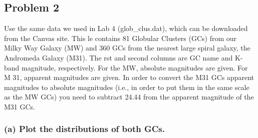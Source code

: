 \documentclass[11pt]{article}
\begin{document}
    \hypertarget{problem-2}{%
\subsection{Problem 2}\label{problem-2}}

    Use the same data we used in Lab 4 (glob\_clus.dat), which can be
downloaded from the Canvas site. This le contains 81 Globular Clusters
(GCs) from our Milky Way Galaxy (MW) and 360 GCs from the nearest large
spiral galaxy, the Andromeda Galaxy (M31). The rst and second columns
are GC name and K-band magnitude, respectively. For the MW, absolute
magnitudes are given. For M 31, apparent magnitudes are given. In order
to convert the M31 GCs apparent magnitudes to absolute magnitudes (i.e.,
in order to put them in the same scale as the MW GCs) you need to
subtract 24.44 from the apparent magnitude of the M31 GCs.

    \hypertarget{a-plot-the-distributions-of-both-gcs.}{%
\subsubsection{(a) Plot the distributions of both
GCs.}\label{a-plot-the-distributions-of-both-gcs.}}
\end{document}
